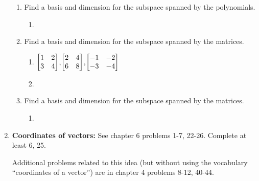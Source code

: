 \begin{enumerate}
\begin{enumerate}
	\item Find a basis and dimension for the subspace spanned by the polynomials.
		\begin{enumerate}
			\item 
		\end{enumerate}

	\item Find a basis and dimension for the subspace spanned by the matrices.
		\begin{enumerate}
			\item $\begin{bmatrix} 1&2\\3&4 \end{bmatrix}$,$\begin{bmatrix} 2&4\\6&8 \end{bmatrix}$,$\begin{bmatrix} -1&-2\\-3&-4 \end{bmatrix}$
			\item 
			
		\end{enumerate}

	\item Find a basis and dimension for the subspace spanned by the matrices.
		\begin{enumerate}
			\item 
		\end{enumerate}
\end{enumerate}

\item \textbf{Coordinates of vectors:}  \label{coordinates problems}
See chapter 6 problems 1-7, 22-26. Complete at least 6, 25. 

Additional problems related to this idea (but without using the vocabulary ``coordinates of a vector'') are in chapter 4 problems 8-12, 40-44.


\end{enumerate}
